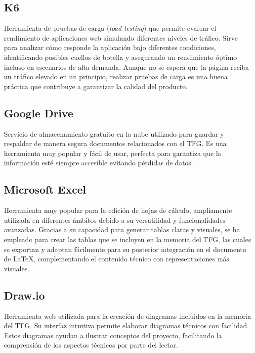 \subsection{K6}
Herramienta de pruebas de carga (\textit{load testing}) que permite evaluar el rendimiento de aplicaciones web simulando diferentes niveles de tráfico. Sirve para analizar cómo responde la aplicación bajo diferentes condiciones, identificando posibles cuellos de botella y asegurando un rendimiento óptimo incluso en escenarios de alta demanda. Aunque no se espera que la página reciba un tráfico elevado en un principio, realizar pruebas de carga es una buena práctica que contribuye a garantizar la calidad del producto.

\subsection{Google Drive}
Servicio de almacenamiento gratuito en la nube utilizado para guardar y respaldar de manera segura documentos relacionados con el TFG. Es una herramienta muy popular y fácil de usar, perfecta para garantiza que la información esté siempre accesible evitando pérdidas de datos.

\subsection{Microsoft Excel}
Herramienta muy popular para la edición de hojas de cálculo, ampliamente utilizada en diferentes ámbitos debido a su versatilidad y funcionalidades avanzadas. Gracias a su capacidad para generar tablas claras y visuales, se ha empleado para crear las tablas que se incluyen en la memoria del TFG, las cuales se exportan y adaptan fácilmente para su posterior integración en el documento de \LaTeX, complementando el contenido técnico con representaciones más visuales.

\subsection{Draw.io}
Herramienta web utilizada para la creación de diagramas incluidos en la memoria del TFG. Su interfaz intuitiva permite elaborar diagramas técnicos con facilidad. Estos diagramas ayudan a ilustrar conceptos del proyecto, facilitando la comprensión de los aspectos técnicos por parte del lector.

